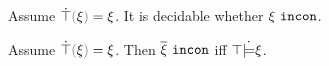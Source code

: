 
\begin{theorem}
\textbf{}  Assume $\ctruify{\xi}=\xi$. It is decidable whether $\xi ~\mathtt{incon}$.
\end{theorem}

\begin{theorem}
  Assume $\ctruify{\xi}=\xi$. Then $\overline{\xi} ~\mathtt{incon}$ iff $\top \dot{\models} \xi$.
\end{theorem}
